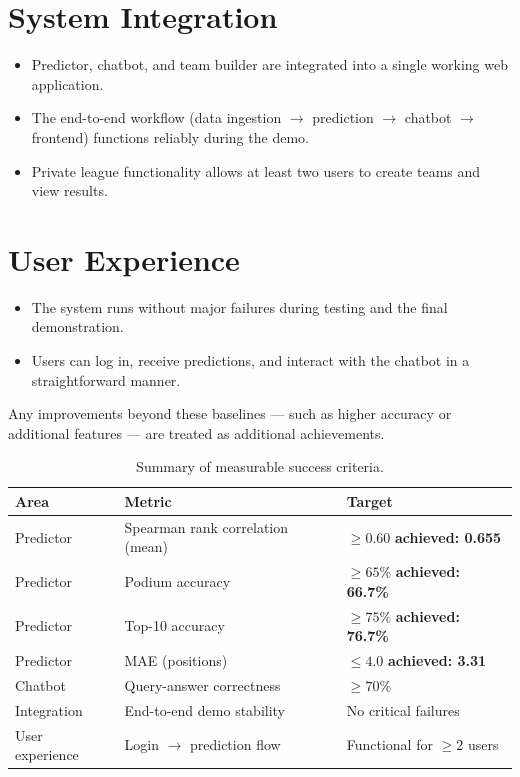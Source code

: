 \documentclass[12pt, a4paper, oneside]{report}
\begin{document}
\section{System Integration}

\begin{itemize}[leftmargin=*]
  \item Predictor, chatbot, and team builder are integrated into a single
        working web application.
  \item The end-to-end workflow (data ingestion $\to$ prediction $\to$
        chatbot $\to$ frontend) functions reliably during the demo.
  \item Private league functionality allows at least two users to create teams
        and view results.
\end{itemize}

\section{User Experience}

\begin{itemize}[leftmargin=*]
  \item The system runs without major failures during testing and the final
        demonstration.
  \item Users can log in, receive predictions, and interact with the chatbot
        in a straightforward manner.
\end{itemize}

Any improvements beyond these baselines — such as higher accuracy or additional
features — are treated as additional achievements.

\begin{table}[H]
\centering
\caption{Summary of measurable success criteria.}
\label{tab:success-criteria}
\begin{tabularx}{\textwidth}{@{} l l X @{}}
  \toprule
  \textbf{Area}        & \textbf{Metric}               & \textbf{Target} \\
  \midrule
  Predictor            & Spearman rank correlation (mean) & $\geq 0.60$ \quad \textbf{achieved: 0.655} \\
  Predictor            & Podium accuracy               & $\geq 65\%$ \quad \textbf{achieved: 66.7\%} \\
  Predictor            & Top-10 accuracy               & $\geq 75\%$ \quad \textbf{achieved: 76.7\%} \\
  Predictor            & MAE (positions)               & $\leq 4.0$ \quad \textbf{achieved: 3.31} \\
  Chatbot              & Query-answer correctness      & $\geq 70\%$ \\
  Integration          & End-to-end demo stability     & No critical failures \\
  User experience      & Login $\to$ prediction flow   & Functional for $\geq 2$ users \\
  \bottomrule
\end{tabularx}
\end{table}
\end{document}

